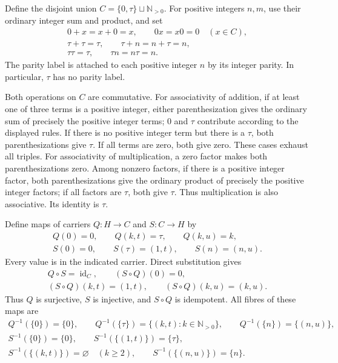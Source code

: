 Define the disjoint union
\(C=\{0,\tau\}\sqcup\mathbb N_{>0}\).  For positive integers \(n,m\),
use their ordinary integer sum and product, and set
\[
\begin{gathered}
0+x=x+0=x,\qquad 0x=x0=0\quad(x\in C),\\
\tau+\tau=\tau,\qquad \tau+n=n+\tau=n,\\
\tau\tau=\tau,\qquad \tau n=n\tau=n.
\end{gathered}
\tag{LPC3}\label{eq:LPC3}
\]
The parity label is attached to each positive integer \(n\) by its
integer parity.  In particular, \(\tau\) has no parity label.

Both operations on \(C\) are commutative.  For associativity of addition,
if at least one of three terms is a positive integer, either
parenthesization gives the ordinary sum of precisely the positive
integer terms; \(0\) and \(\tau\) contribute according to the displayed
rules.  If there is no positive integer term but there is a \(\tau\),
both parenthesizations give \(\tau\).  If all terms are zero, both give
zero.  These cases exhaust all triples.  For associativity of
multiplication, a zero factor makes both parenthesizations zero.  Among
nonzero factors, if there is a positive integer factor, both
parenthesizations give the ordinary product of precisely the positive
integer factors; if all factors are \(\tau\), both give \(\tau\).
Thus multiplication is also associative.  Its identity is \(\tau\).

Define maps of carriers \(Q:H\longrightarrow C\) and
\(S:C\longrightarrow H\) by
\[
\begin{gathered}
Q(0)=0,\qquad Q(k,t)=\tau,\qquad Q(k,u)=k,\\
S(0)=0,\qquad S(\tau)=(1,t),\qquad S(n)=(n,u).
\end{gathered}
\tag{LPC4}\label{eq:LPC4}
\]
Every value is in the indicated carrier.  Direct substitution gives
\[
\begin{gathered}
Q\circ S=\operatorname{id}_C,\qquad
(S\circ Q)(0)=0,\\
(S\circ Q)(k,t)=(1,t),\qquad
(S\circ Q)(k,u)=(k,u).
\end{gathered}
\tag{LPC5}\label{eq:LPC5}
\]
Thus \(Q\) is surjective, \(S\) is injective, and \(S\circ Q\) is
idempotent.  All fibres of these maps are
\[
\begin{gathered}
Q^{-1}(\{0\})=\{0\},\qquad
Q^{-1}(\{\tau\})=\{(k,t):k\in\mathbb N_{>0}\},\qquad
Q^{-1}(\{n\})=\{(n,u)\},\\
S^{-1}(\{0\})=\{0\},\qquad
S^{-1}(\{(1,t)\})=\{\tau\},\\
S^{-1}(\{(k,t)\})=\varnothing\quad(k\geq2),\qquad
S^{-1}(\{(n,u)\})=\{n\}.
\end{gathered}
\tag{LPC6}\label{eq:LPC6}
\]


